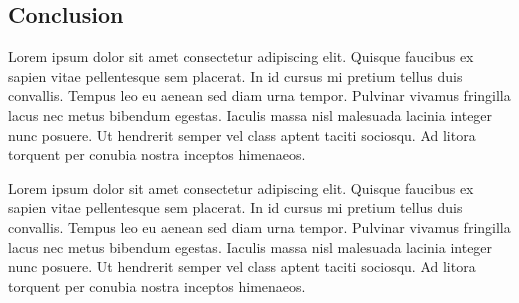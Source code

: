 \documentclass[11pt]{article}
\newcommand{\subsectionwithindent}[1]{
    \subsection*{#1}
    \hspace{\parindent} %
}
\begin{document}
\subsectionwithindent{Conclusion}
Lorem ipsum dolor sit amet consectetur adipiscing elit. Quisque faucibus ex sapien vitae pellentesque sem placerat. In id cursus mi pretium tellus duis convallis. Tempus leo eu aenean sed diam urna tempor. Pulvinar vivamus fringilla lacus nec metus bibendum egestas. Iaculis massa nisl malesuada lacinia integer nunc posuere. Ut hendrerit semper vel class aptent taciti sociosqu. Ad litora torquent per conubia nostra inceptos himenaeos.

Lorem ipsum dolor sit amet consectetur adipiscing elit. Quisque faucibus ex sapien vitae pellentesque sem placerat. In id cursus mi pretium tellus duis convallis. Tempus leo eu aenean sed diam urna tempor. Pulvinar vivamus fringilla lacus nec metus bibendum egestas. Iaculis massa nisl malesuada lacinia integer nunc posuere. Ut hendrerit semper vel class aptent taciti sociosqu. Ad litora torquent per conubia nostra inceptos himenaeos.

\newpage
\printbibliography
\end{document}

